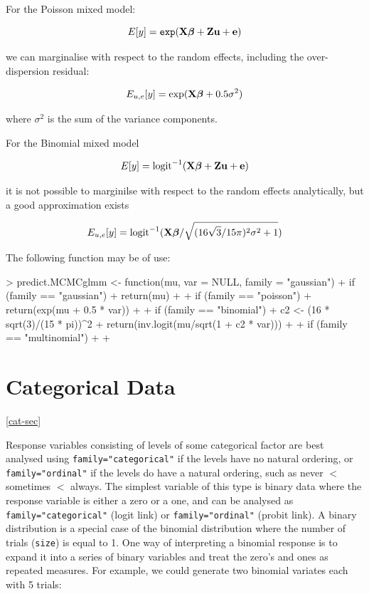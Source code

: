 \documentclass{article}
\begin{document}
For the Poisson mixed model:

\begin{equation}
E[y] = \texttt{exp}({\bf X}{\bm \beta}+{\bf Z}{\bf u}+{\bf e})
\end{equation}

we can marginalise with respect to the random effects, including the over-dispersion residual:

\begin{equation}
E_{{u,e}}[y] = \textrm{exp}({\bf X}{\bm \beta}+0.5\sigma^{2})
\end{equation}

where $\sigma^{2}$ is the sum of the variance components.

For the Binomial mixed model

\begin{equation}
E[y] = \textrm{logit}^{-1}({\bf X}{\bm \beta}+{\bf Z}{\bf u}+{\bf e})
\end{equation}

it is not possible to marginilse with respect to the random effects analytically, but a good approximation exists \citep{Diggle.2004}

\begin{equation}
E_{{u,e}}[y] = \textrm{logit}^{-1}({\bf X}{\bm \beta}/\sqrt{(16\sqrt{3}/15\pi)^{2}\sigma^{2}+1})
\end{equation}

The following function may be of use:

\begin{Schunk}
\begin{Sinput}
> predict.MCMCglmm <- function(mu, var = NULL, family = "gaussian") {
+     if (family == "gaussian") {
+         return(mu)
+     }
+     if (family == "poisson") {
+         return(exp(mu + 0.5 * var))
+     }
+     if (family == "binomial") {
+         c2 <- (16 * sqrt(3)/(15 * pi))^2
+         return(inv.logit(mu/sqrt(1 + c2 * var)))
+     }
+     if (family == "multinomial") {
+     }
+ }
\end{Sinput}
\end{Schunk}

\section{Categorical Data}
\ref{cat-sec}

Response variables consisting of levels of some categorical factor are best analysed using \texttt{family="categorical"} if the levels have no natural ordering,  or \texttt{family="ordinal"} if the levels do have a natural ordering, such as never $<$ sometimes $<$ always. The simplest variable of this type is binary data where the response variable is either a zero or a one, and can be analysed as \texttt{family="categorical"} (logit link) or \texttt{family="ordinal"} (probit link).   A binary distribution is a special case of the binomial distribution where the number of trials (\texttt{size}) is equal to 1. One way of interpreting a binomial response is to expand it into a series of binary variables and treat the zero's and ones as repeated measures. For example, we could generate two binomial variates each with 5 trials:
\end{document}
